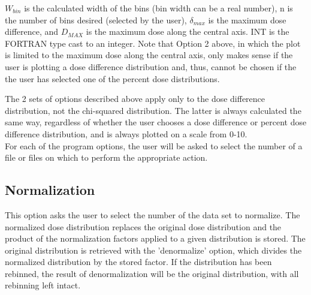 \documentclass[12pt,twoside]{article}
\begin{document}
$W_{bin}$  is the calculated width of the bins (bin width can be a real
number), n is the number of bins desired (selected by the user),
$\delta_{max}$ is the maximum dose difference, and $D_{MAX}$ is the
maximum dose along the central axis. INT is the FORTRAN type cast to an
integer.  Note that Option 2 above, in which the plot is limited to the
maximum dose along the central axis, only makes sense if the user is plotting
a dose difference distribution and, thus, cannot be chosen if the
the user has selected one of the percent dose distributions.

The 2 sets of options described above apply only to the
dose difference distribution, not the chi-squared distribution.  The latter
is always calculated the same way, regardless of whether the user chooses
a dose difference or percent dose difference distribution, and is always
plotted on a scale from 0-10.
\\

For each of the program options, the user will be asked to select the number of a file or files on which to perform the appropriate action.


\subsection{Normalization}

This option asks the user to select the number of the data set to
normalize. The normalized dose distribution replaces the original dose
distribution and the product of the normalization factors applied to a
given distribution is stored. The original distribution is retrieved with
the 'denormalize' option, which divides the normalized distribution by the
stored factor. If the distribution has been rebinned, the result of
denormalization will be the original distribution, with all rebinning left
intact.
\end{document}

